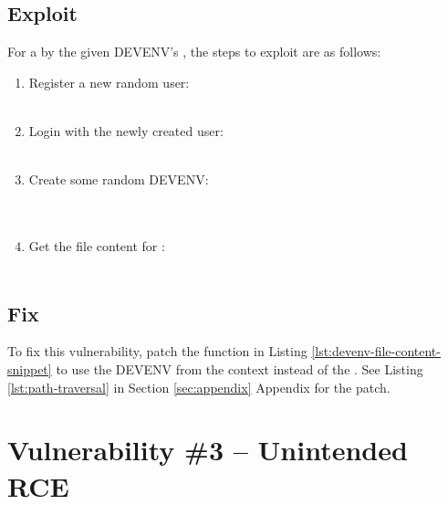 \documentclass[10pt]{article}
\begin{document}
\subsection{Exploit}

For a by the  given DEVENV's , the steps to exploit are as follows:
\begin{enumerate}
	\item Register a new random user: \\
	       \\
	\item Login with the newly created user: \\
	       \\
	\item Create some random DEVENV: \\
	       \\
	       \\
	\item Get the file content for : \\
	       \\
\end{enumerate}

\subsection{Fix}

To fix this vulnerability, patch the  function in Listing \ref{lst:devenv-file-content-snippet} to use the DEVENV from the context instead of the . See Listing \ref{lst:path-traversal} in Section \ref{sec:appendix} Appendix for the patch.

\section{Vulnerability \#3 -- Unintended RCE}
\end{document}
